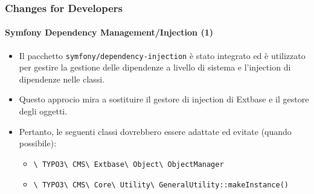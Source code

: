 \begin{frame}[fragile]
	\frametitle{Changes for Developers}
	\framesubtitle{Symfony Dependency Management/Injection (1)}

	\begin{itemize}
		\item Il pacchetto \texttt{symfony/dependency-injection} è stato integrato
			ed è utilizzato per gestire la gestione delle dipendenze a livello di sistema e l'injection
			di dipendenze nelle classi.

		\item Questo approcio mira a sostituire il gestore di injection di Extbase
			e il gestore degli oggetti.

		\item Pertanto, le seguenti classi dovrebbero essere adattate ed evitate (quando possibile):

			\begin{itemize}\small
				\item \texttt{\textbackslash
					TYPO3\textbackslash
					CMS\textbackslash
					Extbase\textbackslash
					Object\textbackslash
					ObjectManager}
				\item \texttt{\textbackslash
					TYPO3\textbackslash
					CMS\textbackslash
					Core\textbackslash
					Utility\textbackslash
					GeneralUtility::makeInstance()}
			\end{itemize}\normalsize

	\end{itemize}

\end{frame}


